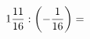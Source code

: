 \documentclass[preview]{standalone}
\begin{document}
\begin{align*}
1 { 11 \over 16 }  :  \left( - { 1 \over 16 } \right)  =
\end{align*}
\end{document}
